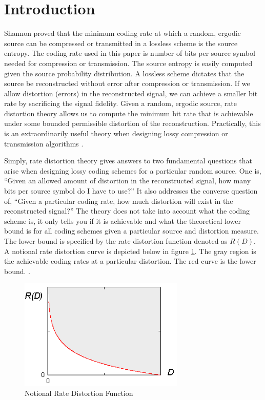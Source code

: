 \documentclass[journal]{IEEEtran}
\begin{document}
\section{Introduction}
 Shannon proved that the minimum coding rate at which a random, ergodic source can be compressed or transmitted in a lossless scheme is the source entropy. The coding rate used in this paper is number of bits per source symbol needed for compression or transmission. The source entropy is easily computed given the source probability distribution. A lossless scheme dictates that the source be reconstructed without error after compression or transmission. If we allow distortion (errors) in the reconstructed signal, we can achieve a smaller bit rate by sacrificing the signal fidelity. Given a random, ergodic source, rate distortion theory allows us to compute the minimum bit rate that is achievable under some bounded permissible distortion of the reconstruction. Practically, this is an extraordinarily useful theory when designing lossy compression or transmission algorithms \cite{shannon}.
\par Simply, rate distortion theory gives answers to two fundamental questions that arise when designing lossy coding schemes for a particular random source. One is, ``Given an allowed amount of distortion in the reconstructed signal, how many bits per source symbol do I have to use?'' It also addresses the converse question of, ``Given a particular coding rate, how much distortion will exist in the reconstructed signal?'' The theory does not take into account what the coding scheme is, it only tells you if it is achievable and what the theoretical lower bound is for all coding schemes given a particular source and distortion measure. The lower bound is specified by the rate distortion function denoted as \(R(D)\). A notional rate distortion curve is depicted below in figure \ref{fig:notional}. The gray region is the achievable coding rates at a particular distortion. The red curve is the lower bound. \cite{blahut}.

\begin{figure}[!h]
\centering
\includegraphics[width=3.1in]{../images/notional.png}
\caption{Notional Rate Distortion Function}
\label{fig:notional}
\end{figure}
\end{document}
